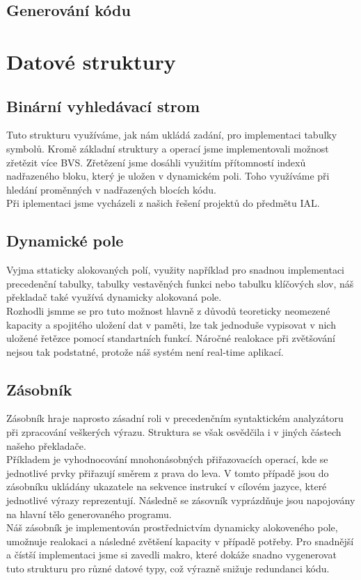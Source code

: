 \documentclass[11pt]{article}
\begin{document}
	\subsection{Generování kódu}
	
    \section{Datové struktury}
    
    \subsection{Binární vyhledávací strom}
        Tuto strukturu využíváme, jak nám ukládá zadání, pro implementaci tabulky symbolů. Kromě základní struktury a operací jsme implementovali možnost zřetězit více BVS. Zřetězení jsme dosáhli využitím přítomností indexů nadřazeného bloku, který je uložen v dynamickém poli. Toho využíváme při hledání proměnných v nadřazených blocích kódu.\\
        Při iplementaci jsme vycházeli z našich řešení projektů do předmětu IAL.
    
    \subsection{Dynamické pole}
        Vyjma sttaticky alokovaných polí, využity například pro snadnou implementaci precedenční tabulky, tabulky vestavěných funkci nebo tabulku klíčových slov, náš překladač také využívá dynamicky alokovaná pole. \\
        \indent Rozhodli jsmme se pro tuto možnost hlavně z důvodů teoreticky neomezené kapacity a spojitého uložení dat v paměti, lze tak jednoduše vypisovat v nich uložené řetězce pomocí standartních funkcí. Náročné realokace při zvětšování nejsou tak podstatné, protože náš systém není real-time aplikací.
    
    \subsection{Zásobník}
        Zásobník hraje naprosto zásadní roli v precedenčním syntaktickém analyzátoru při zpracování veškerých výrazu. Struktura se však osvědčila i v jiných částech našeho překladače. \\
        \indent Příkladem je vyhodnocování mnohonásobných přiřazovacích operací, kde se jednotlivé prvky přiřazují směrem z prava do leva. V tomto případě jsou do zásobníku ukládány ukazatele na sekvence instrukcí v cílovém jazyce, které jednotlivé výrazy reprezentují. Následně se zásovník vyprázdňuje jsou napojovány na hlavní tělo generovaného programu. \\
        \indent Náš zásobník je implementován prostřednictvím dynamicky alokoveného pole, umožnuje realokaci a následné zvětšení kapacity v případě potřeby. Pro snadnější a čístší implementaci jsme si zavedli makro, které dokáže snadno vygenerovat tuto strukturu pro různé datové typy, což výrazně snižuje redundanci kódu.
        
\end{document}
